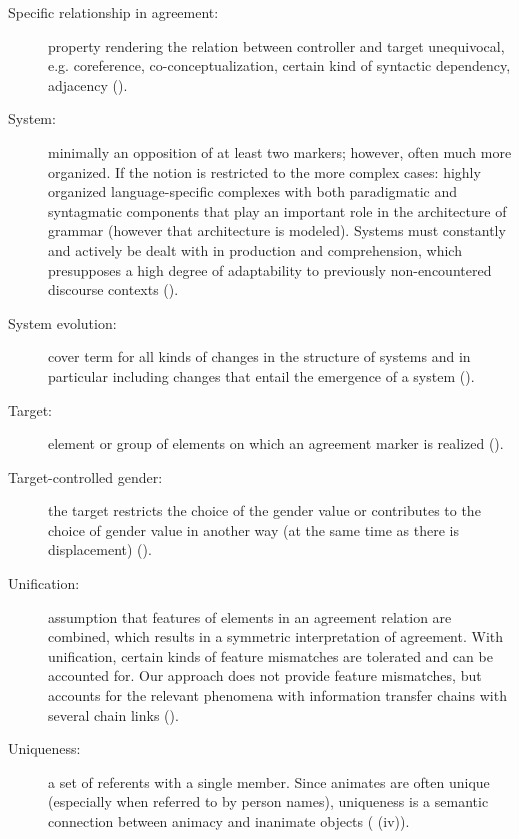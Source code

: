 \documentclass[output=collectionpaper]{langsci/langscibook}
\begin{document}
{\begin{description}
\item  [Specific relationship in agreement:] property rendering the relation between controller and target unequivocal, e.g. coreference, co-conceptualization, certain kind of syntactic dependency, adjacency ().
\item  [System:] minimally an opposition of at least two markers; however, often much more organized. If the notion is restricted to the more complex cases: highly organized language-specific complexes with both paradigmatic and syntagmatic components that play an important role in the architecture of grammar (however that architecture is modeled). Systems must constantly and actively be dealt with in production and comprehension, which presupposes a high degree of adaptability to previously non-encountered discourse contexts ().
\item  [System evolution:] cover term for all kinds of changes in the structure of systems and in particular including changes that entail the emergence of a system ().
\item  [Target:] element or group of elements on which an agreement marker is realized ().
\item  [Target-controlled gender:] the target restricts the choice of the gender value or contributes to the choice of gender value in another way (at the same time as there is displacement) ().
\item  [Unification:] assumption that features of elements in an agreement relation are combined, which results in a symmetric interpretation of agreement. With unification, certain kinds of feature mismatches are tolerated and can be accounted for. Our approach does not provide feature mismatches, but accounts for the relevant phenomena with information transfer chains with several chain links ().
\item  [Uniqueness:] a set of referents with a single member. Since animates are often unique (especially when referred to by person names), uniqueness is a semantic connection between animacy and inanimate objects ( (iv)).
\end{description}}
\end{document}
